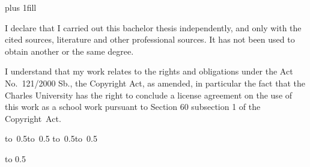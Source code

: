 \newpage

\openright
\hypersetup{pageanchor=true}
\pagestyle{plain}
\vglue 0pt plus 1fill

\noindent
I declare that I carried out this bachelor thesis independently, and only with the cited
sources, literature and other professional sources. It has not been used to obtain another
or the same degree.

\medskip\noindent
I understand that my work relates to the rights and obligations under the Act No.~121/2000 Sb.,
the Copyright Act, as amended, in particular the fact that the Charles
University has the right to conclude a license agreement on the use of this
work as a school work pursuant to Section 60 subsection 1 of the Copyright~Act.

\vspace{10mm}

\hbox{\hbox to 0.5\hbox to 0.5\hsize{\dotfill\quad}}
\smallskip
\hbox{\hbox to 0.5\hsize{}\hbox to 0.5}

\vspace{20mm}
\newpage


\openright

\noindent
\Dedication

\newpage


\openright

\vbox to 0.5

\newpage

\openright
\pagestyle{plain}
\setcounter{page}{1}
